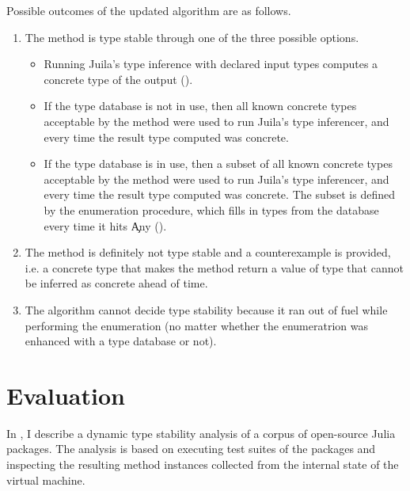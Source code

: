 Possible outcomes of the updated algorithm are as follows.
\begin{enumerate}

  \item The method is type stable through one of the three possible options.
\begin{itemize}
  \item
  Running Juila's type inference with declared
  input types computes a concrete type of the output
  ().

  \item If the type database is not in use, then all known concrete
  types
  acceptable by the method were used to run Juila's
  type inferencer, and every time the result type computed was concrete.

  \item
  If the type database is in use,
  then a subset of all known concrete
  types
  acceptable by the method were used to run Juila's
  type inferencer, and every time the result type computed was concrete.
  The subset is defined by the
  enumeration procedure, which fills in types from the database every time it
  hits \c{Any}
  ().
\end{itemize}

  \item The method is definitely not type stable and a counterexample is provided,
  i.e. a
  concrete type that makes the method return a value of type that cannot be
  inferred as concrete ahead of time.

  \item
  The algorithm cannot decide type stability because it ran out of fuel
  while performing the enumeration (no matter whether the enumeratrion
  was enhanced with a type database or not).
\end{enumerate}


\section{Evaluation}%
\label{sec:approx:eval}

In , I describe a dynamic type stability analysis of a
corpus of open-source Julia packages. The analysis is based on executing test
suites of the packages and inspecting the resulting method instances collected
from the internal state of the virtual machine.

